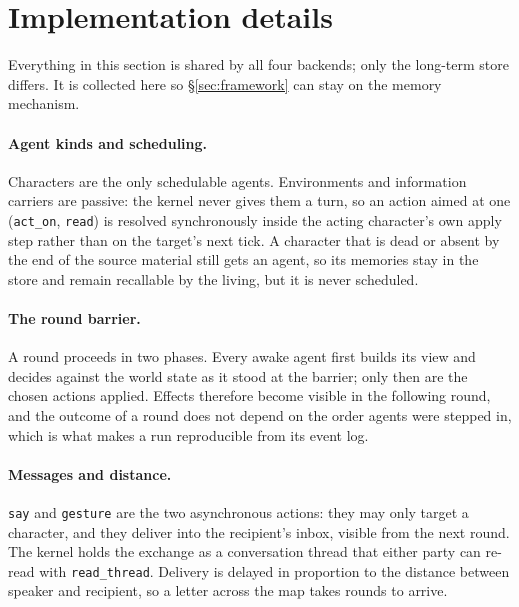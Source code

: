 \documentclass{article}
\newcommand{\code}[1]{\texttt{\small #1}}
\begin{document}


\appendix

\section{Implementation details}
\label{app:impl}

Everything in this section is shared by all four backends; only the long-term
store differs. It is collected here so \S\ref{sec:framework} can stay on the
memory mechanism.

\paragraph{Agent kinds and scheduling.} Characters are the only schedulable
agents. Environments and information carriers are passive: the kernel never
gives them a turn, so an action aimed at one (\code{act\_on}, \code{read})
is resolved synchronously inside the acting character's own apply step rather
than on the target's next tick. A character that is dead or absent by the end
of the source material still gets an agent, so its memories stay in the store
and remain recallable by the living, but it is never scheduled.

\paragraph{The round barrier.} A round proceeds in two phases. Every awake
agent first builds its view and decides against the world state as it stood at
the barrier; only then are the chosen actions applied. Effects therefore become
visible in the following round, and the outcome of a round does not depend on
the order agents were stepped in, which is what makes a run reproducible from
its event log.

\paragraph{Messages and distance.} \code{say} and \code{gesture} are the two
asynchronous actions: they may only target a character, and they deliver into
the recipient's inbox, visible from the next round. The kernel holds the
exchange as a conversation thread that either party can re-read with
\code{read\_thread}. Delivery is delayed in proportion to the distance between
speaker and recipient, so a letter across the map takes rounds to arrive.
\end{document}
